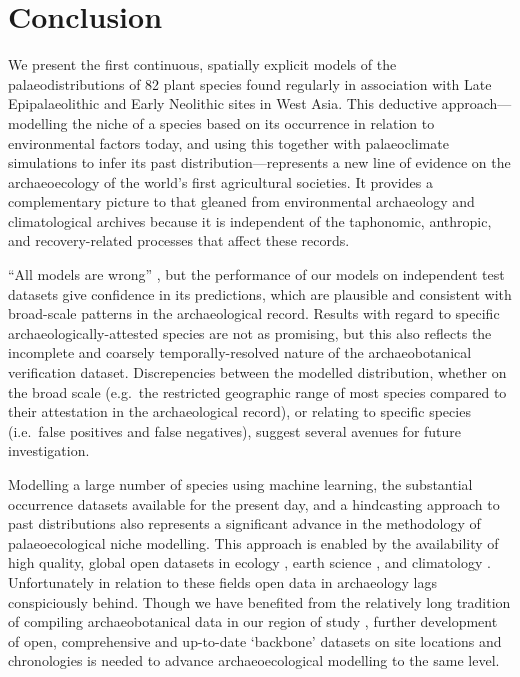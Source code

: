 \documentclass[
  authoryear,
  preprint]{elsarticle}
\begin{document}
\section{Conclusion}\label{conclusion}

We present the first continuous, spatially explicit models of the
palaeodistributions of 82 plant species found regularly in association
with Late Epipalaeolithic and Early Neolithic sites in West Asia. This
deductive approach---modelling the niche of a species based on its
occurrence in relation to environmental factors today, and using this
together with palaeoclimate simulations to infer its past
distribution---represents a new line of evidence on the archaeoecology
of the world's first agricultural societies. It provides a complementary
picture to that gleaned from environmental archaeology and
climatological archives because it is independent of the taphonomic,
anthropic, and recovery-related processes that affect these records.

``All models are wrong'' \citep{Box1976}, but the performance of our
models on independent test datasets give confidence in its predictions,
which are plausible and consistent with broad-scale patterns in the
archaeological record. Results with regard to specific
archaeologically-attested species are not as promising, but this also
reflects the incomplete and coarsely temporally-resolved nature of the
archaeobotanical verification dataset. Discrepencies between the
modelled distribution, whether on the broad scale (e.g.~the restricted
geographic range of most species compared to their attestation in the
archaeological record), or relating to specific species (i.e.~false
positives and false negatives), suggest several avenues for future
investigation.

Modelling a large number of species using machine learning, the
substantial occurrence datasets available for the present day, and a
hindcasting approach to past distributions also represents a significant
advance in the methodology of palaeoecological niche modelling. This
approach is enabled by the availability of high quality, global open
datasets in ecology \citep{GBIF2025, GBIFSecretariat2023}, earth science
\citep{SRTM}, and climatology \citep{KargerEtAl2017, BrownEtAl2018}.
Unfortunately in relation to these fields open data in archaeology lags
conspiciously behind. Though we have benefited from the relatively long
tradition of compiling archaeobotanical data in our region of study
\citep{ColledgeEtAl2004, ShennanConolly2007, ADEMNES, LucasFuller2018, FullerEtAl2018, WallaceEtAl2018, ORIGINS},
further development of open, comprehensive and up-to-date `backbone'
datasets on site locations and chronologies is needed to advance
archaeoecological modelling to the same level.
\end{document}
